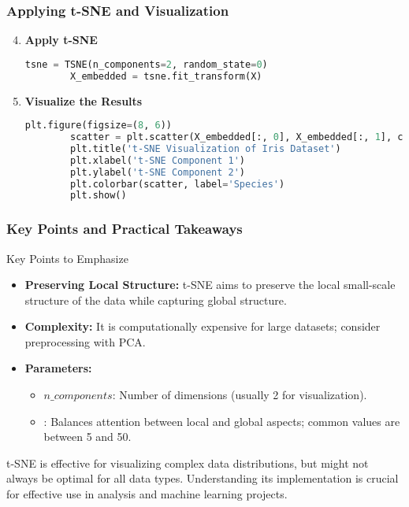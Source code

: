 \documentclass[aspectratio=169]{beamer}
\begin{document}
\begin{frame}[fragile]
    \frametitle{Applying t-SNE and Visualization}
    \begin{enumerate}
        \setcounter{enumi}{3}
        \item \textbf{Apply t-SNE}
        \begin{lstlisting}[language=python]
        tsne = TSNE(n_components=2, random_state=0)
        X_embedded = tsne.fit_transform(X)
        \end{lstlisting}
        
        \item \textbf{Visualize the Results}
        \begin{lstlisting}[language=python]
        plt.figure(figsize=(8, 6))
        scatter = plt.scatter(X_embedded[:, 0], X_embedded[:, 1], c=y, cmap='viridis', edgecolor='k', s=100)
        plt.title('t-SNE Visualization of Iris Dataset')
        plt.xlabel('t-SNE Component 1')
        plt.ylabel('t-SNE Component 2')
        plt.colorbar(scatter, label='Species')
        plt.show()
        \end{lstlisting}
    \end{enumerate}
\end{frame}

\begin{frame}[fragile]
    \frametitle{Key Points and Practical Takeaways}
    \begin{block}{Key Points to Emphasize}
        \begin{itemize}
            \item \textbf{Preserving Local Structure:} t-SNE aims to preserve the local small-scale structure of the data while capturing global structure.
            \item \textbf{Complexity:} It is computationally expensive for large datasets; consider preprocessing with PCA.
            \item \textbf{Parameters:} 
            \begin{itemize}
                \item $n\_components$: Number of dimensions (usually 2 for visualization).
                \item {}: Balances attention between local and global aspects; common values are between 5 and 50.
            \end{itemize}
        \end{itemize}
    \end{block}
    
    \vspace{0.5cm} %
    t-SNE is effective for visualizing complex data distributions, but might not always be optimal for all data types. Understanding its implementation is crucial for effective use in analysis and machine learning projects.
\end{frame}
\end{document}
